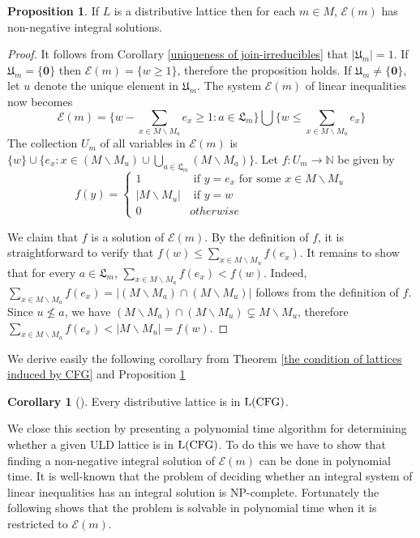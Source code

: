 \documentclass{article}
\theoremstyle{definition}
\newtheorem{coro}{Corollary}
\newtheorem{prop}{Proposition}
\newcommand\down[1]{e_{#1}}
\newcommand\set[1]{\{ #1 \}}
\begin{document}
\begin{prop}
\label{lemma of the condition on distributive lattice}
If $L$ is a distributive lattice then for each $m \in M$, $\mathcal{E}(m)$ has non-negative integral solutions.
\end{prop}
\begin{proof}
It follows from Corollary \ref{uniqueness of join-irreducibles} that $|\mathfrak{U}_m|=1$. If $\mathfrak{U}_m=\set{\textbf{0}}$ then $\mathcal{E}(m)=\set{w\geq 1}$, therefore the proposition holds. If $\mathfrak{U}_m\neq \set{\textbf{0}}$,  let $u$ denote the unique element in $\mathfrak{U}_m$. The system $\mathcal{E}(m)$ of linear inequalities now becomes
$$
\mathcal{E}(m)=\set{w-\underset{x \in M\backslash M_a}{\sum} \down{x}\geq 1 : a \in \mathfrak{L}_m}\bigcup \set{ w \leq \underset{x \in M\backslash M_u}{\sum}\down{x} }
$$
The collection $U_m$ of all variables in $\mathcal{E}(m)$ is $\set{w}\cup \set{\down{x}: x \in (M\backslash M_u)\cup \underset{a \in \mathfrak{L}_m}{\bigcup} (M\backslash M_a)}$. Let $f:U_m\to \mathbb{N}$ be given by
$$
f(y)=\begin{cases}
1&\text{ if }y=\down{x} \text{ for some } x \in M\backslash M_u \\
|M\backslash M_u|&\text{ if } y=w\\
0& otherwise
\end{cases}
$$

We claim that $f$ is a solution of $\mathcal{E}(m)$. By the definition of $f$, it is straightforward to verify that $f(w)\leq \underset{x\in M\backslash M_u}{\sum} f(\down{x})$. It remains to show that for every $a\in \mathfrak{L}_m$, $\underset{x \in M\backslash M_a}{\sum}f(\down{x})<f(w)$. Indeed, $\underset{x \in M\backslash M_a}{\sum}f(\down{x})=|(M\backslash M_a)\cap (M\backslash M_u)|$ follows from the definition of $f$. Since $u \not \leq a$, we have $(M\backslash M_a)\cap (M\backslash M_u)\subsetneq M \backslash M_u$, therefore $\underset{x \in M\backslash M_a}{\sum}f(\down{x})<|M\backslash M_u|=f(w)$.  
\end{proof}
We derive easily the following corollary from Theorem \ref{the condition of lattices induced by CFG} and Proposition \ref{lemma of the condition on distributive lattice}
\begin{coro}[\cite{MVP01}]Every distributive lattice is in ${\rm L(CFG)}$.
\end{coro}
We close this section by presenting a polynomial time algorithm for determining whether a given ULD lattice is in ${\rm L(CFG)}$. To do this we have to show that finding a non-negative integral solution of $\mathcal{E}(m)$ can be done in polynomial time. It is well-known that the problem of deciding whether an integral system of linear inequalities has an integral solution is NP-complete. Fortunately the following shows that the problem is solvable in polynomial time when it is restricted to $\mathcal{E}(m)$.
\end{document}
